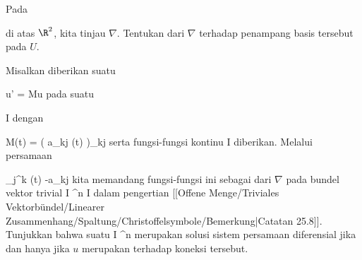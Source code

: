 {}
{

Pada

 di atas $\R^2$, kita tinjau
$\nabla$.
 {Tentukan
dari $\nabla$ terhadap penampang basis tersebut pada $U$.
}

}
{} {}

{}
{

Misalkan diberikan suatu

\mavergleichskettedisp
{\vergleichskette
{ u'
}
{ =} { Mu
}
{ } {
}
{ } {
}
{ } {
}
}
{}{}{}
pada suatu

\mavergleichskette
{\vergleichskette
{ I
}
{ \subseteq }{ \R
}
{  }{
}
{    }{
}
{   }{
}
}
{}{}{}
dengan

\mavergleichskettedisp
{\vergleichskette
{ M(t)
}
{ =} { \left(  a_{kj} (t)  \right)_{kj}
}
{ } {
}
{ } {
}
{ } {
}
}
{}{}{}
 {} {}
serta fungsi-fungsi kontinu
 { I } {\R
} {}
diberikan.
Melalui persamaan

\mavergleichskettedisp
{\vergleichskette
{ \Gamma_{j}^k (t)
}
{ } { -a_{kj}
}
{ } {
}
{ } {
}
{ } {
}
}
{}{}{}
kita memandang fungsi-fungsi ini sebagai
 {} {}
dari
$\nabla$ pada bundel vektor trivial
 {I \times \R^n } { I
} {}
dalam pengertian
[[Offene Menge/Triviales Vektorbündel/Linearer Zusammenhang/Spaltung/Christoffelsymbole/Bemerkung|Catatan 25.8]].
Tunjukkan bahwa suatu
 { I } { \R^n
} {}
merupakan solusi sistem persamaan diferensial jika dan hanya jika $u$ merupakan
terhadap koneksi tersebut.

}
{} {}

